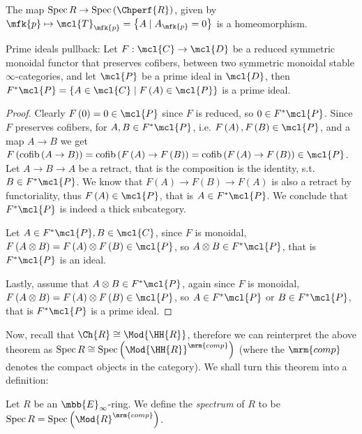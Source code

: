 \begin{theorem}
	The map $\spec R \to \spec\left(\Chperf{R}\right)$,
	given by $\mfk{p} \mapsto \mcl{T}_\mfk{p} = \left\{ A \mid A_\mfk{p} = 0 \right\}$
	is a homeomorphism.
\end{theorem}

\begin{proposition}\label{primes-pullback}
	Prime ideals pullback:
	Let $F: \mcl{C} \to \mcl{D}$ be a reduced symmetric monoidal functor that preserves cofibers, between two symmetric monoidal stable $\infty$-categories,
	and let $\mcl{P}$ be a prime ideal in $\mcl{D}$, then $F^*\mcl{P} = \left\{ A \in \mcl{C} \mid F\left(A\right) \in \mcl{P} \right\}$ is a prime ideal.
\end{proposition}

\begin{proof}
	Clearly $F\left(0\right) = 0 \in \mcl{P}$ since $F$ is reduced, so $0 \in F^*\mcl{P}$.
	Since $F$ preserves cofibers, for $A,B \in F^*\mcl{P}$, i.e. $F\left(A\right), F\left(B\right) \in \mcl{P}$, and a map $A \to B$ we get
	$
	F\left(\cofib\left(A \to B\right)\right)
	= \cofib\left(F\left(A\right) \to F\left(B\right)\right)
	= \cofib\left(F\left(A\right) \to F\left(B\right)\right)
	\in \mcl{P}
	$.
	Let $A \to B \to A$ be a retract, that is the composition is the identity, s.t. $B \in F^*\mcl{P}$. We know that $F\left(A\right) \to F\left(B\right) \to F\left(A\right)$ is also a retract by functoriality, thus $F\left(A\right) \in \mcl{P}$, that is $A \in F^*\mcl{P}$.
	We conclude that $F^*\mcl{P}$ is indeed a thick subcategory.
	
	Let $A \in F^*\mcl{P}, B \in \mcl{C}$, since $F$ is monoidal, $F\left(A \otimes B\right) = F\left(A\right) \otimes F\left(B\right) \in \mcl{P}$, so $A \otimes B \in F^*\mcl{P}$, that is $F^*\mcl{P}$ is an ideal.
	
	Lastly, assume that $A \otimes B \in F^*\mcl{P}$, again since $F$ is monoidal, $F\left(A \otimes B\right) = F\left(A\right) \otimes F\left(B\right) \in \mcl{P}$, so $A \in F^*\mcl{P}$ or $B \in F^*\mcl{P}$, that is $F^*\mcl{P}$ is a prime ideal.
\end{proof}

Now, recall that $\Ch{R} \cong \Mod{\HH{R}}$, therefore we can reinterpret the above theorem as $\spec R \cong \spec\left( \Mod{\HH{R}}^\mrm{comp} \right)$ (where the $\mrm{comp}$ denotes the compact objects in the category).
We shall turn this theorem into a definition:

\begin{definition}
	Let $R$ be an $\mbb{E}_\infty$-ring.
	We define the \emph{spectrum} of $R$ to be
	$\spec R = \spec\left( \Mod{R}^\mrm{comp} \right)$.
\end{definition}

